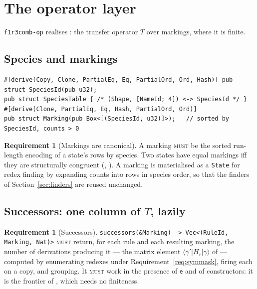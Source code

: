 \documentclass[11pt,a4paper]{article}
\newcommand{\code}[1]{\texttt{#1}}
\newcommand{\MUST}{\textsc{must}}
\newcommand{\ev}{\mathsf{e}}
\theoremstyle{definition}
\newtheorem{requirement}[definition]{Requirement}
\theoremstyle{plain}
\begin{document}
\section{The operator layer}\label{sec:op}

\code{f1r3comb-op} realises \cite[\S5]{matnote}: the transfer operator $T$
over markings, where it is finite.

\subsection{Species and markings}

\begin{lstlisting}
#[derive(Copy, Clone, PartialEq, Eq, PartialOrd, Ord, Hash)] pub struct SpeciesId(pub u32);
pub struct SpeciesTable { /* (Shape, [NameId; 4]) <-> SpeciesId */ }
#[derive(Clone, PartialEq, Eq, Hash, PartialOrd, Ord)]
pub struct Marking(pub Box<[(SpeciesId, u32)]>);   // sorted by SpeciesId, counts > 0
\end{lstlisting}

\begin{requirement}[Markings are canonical]\label{req:marking}
A marking \MUST{} be the sorted run-length encoding of a state's rows by
species. Two states have equal markings iff they are structurally congruent
(\cite[F2]{matnote}, \cite[Def.~2.9]{logic}). A marking is materialised as a
\code{State} for redex finding by expanding counts into rows in species
order, so that the finders of Section~\ref{sec:finders} are reused unchanged.
\end{requirement}

\subsection{Successors: one column of $T$, lazily}

\begin{requirement}[Successors]\label{req:succ}
\code{successors(\&Marking) -> Vec<(RuleId, Marking, Nat)>} \MUST{} return,
for each rule and each resulting marking, the number of derivations
producing it --- the matrix element
$\langle \gamma' | H_{r} | \gamma \rangle$ of \cite[Prop.~5.3]{matnote} ---
computed by enumerating redexes under Requirement~\ref{req:symmask}, firing
each on a copy, and grouping. It \MUST{} work in the presence of $\ev$ and of
constructors: it is the frontier of \cite[\S6.1, route (2)]{matnote}, which
needs no finiteness.
\end{requirement}
\end{document}

